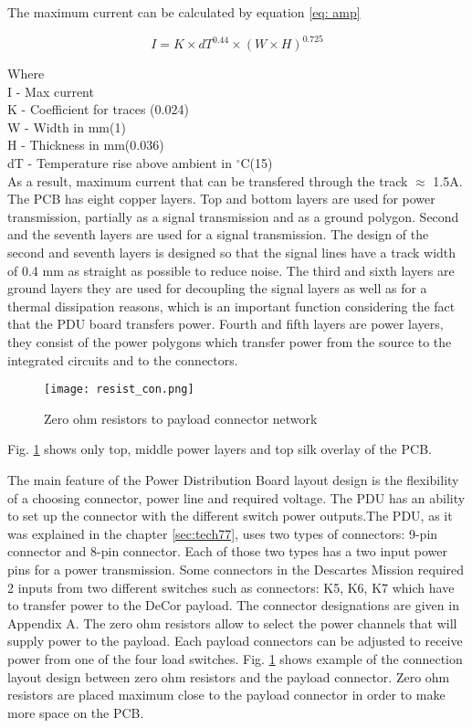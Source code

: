 The maximum current can be calculated by equation \ref{eq: amp}

\begin{equation}\label{eq: amp}
I = K \times dT^{0.44} \times (W \times H)^{0.725}
\end{equation}

Where\\

I - Max current\\
K - Coefficient for traces (0.024)\\
W - Width in mm(1)\\
H - Thickness in mm(0.036) \\
dT - Temperature rise above ambient in $^\circ$C(15)\\

As a result, maximum current that can be transfered through the track $\approx$ 1.5A.\\ 

The PCB  has eight copper layers. Top and bottom layers are used for power transmission, partially as a signal transmission and as a ground polygon. Second and the seventh layers are used for a signal transmission. The design of the second and seventh layers is designed so that the signal lines have a track width of 0.4 mm as straight as possible to reduce noise. The third and sixth layers are ground layers they are used for decoupling the signal layers as well as for a thermal dissipation reasons, which is an important function considering the fact that the PDU board transfers power. Fourth and fifth layers are power layers, they consist of the power polygons which transfer power from the source to the integrated circuits and to the connectors.   

\begin{figure}[h]
	\centering
	\texttt{[image: resist\_con.png]}
	\caption{Zero ohm resistors to payload connector network}
	\label{fig: res}
\end{figure} 


Fig. \ref{fig: res} shows only top, middle power layers and top silk overlay of the PCB.

  
The main feature of the Power Distribution Board layout design is the flexibility of a choosing connector, power line and required voltage. The PDU has an ability to set up the connector with the different switch power outputs.The PDU, as it was explained in the chapter \ref{sec:tech77}, uses two types of connectors: 9-pin connector and 8-pin connector. Each of those two types has a two input power pins for a power transmission.  Some connectors in the Descartes Mission required 2 inputs from two different switches such as connectors: K5, K6, K7 which have to transfer power to the DeCor payload. The connector designations are given in Appendix A. The zero ohm resistors allow to select the power channels that will supply power to the payload. Each payload connectors can be adjusted to receive power from one of the four load switches. Fig. \ref{fig: res} shows example of the connection layout design between zero ohm resistors and the payload connector. Zero ohm resistors are placed maximum close to the payload connector in order to make more space on the PCB. 

